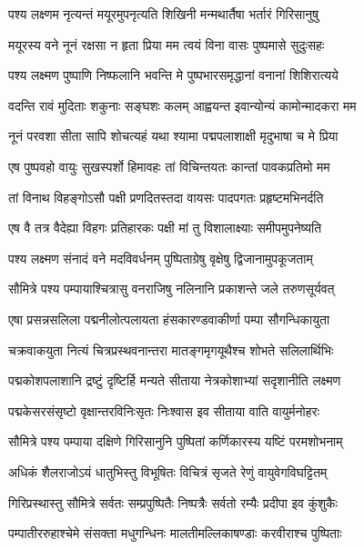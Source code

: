 \twolineshloka
{पश्य लक्ष्णम नृत्यन्तं मयूरमुपनृत्यति}
{शिखिनी मन्मथार्तैषा भर्तारं गिरिसानुषु} %

\twolineshloka
{मयूरस्य वने नूनं रक्षसा न हृता प्रिया}
{मम त्वयं विना वासः पुष्पमासे सुदुःसहः} %

\twolineshloka
{पश्य लक्ष्मण पुष्पाणि निष्फलानि भवन्ति मे}
{पुष्पभारसमृद्धानां वनानां शिशिरात्यये} %

\twolineshloka
{वदन्ति रावं मुदिताः शकुनाः सङ्घशः कलम्}
{आह्वयन्त इवान्योन्यं कामोन्मादकरा मम} %

\twolineshloka
{नूनं परवशा सीता सापि शोचत्यहं यथा}
{श्यामा पद्मपलाशाक्षी मृदुभाषा च मे प्रिया} %

\twolineshloka
{एष पुष्पवहो वायुः सुखस्पर्शो हिमावहः}
{तां विचिन्तयतः कान्तां पावकप्रतिमो मम} %

\twolineshloka
{तां विनाथ विहङ्गोऽसौ पक्षी प्रणदितस्तदा}
{वायसः पादपगतः प्रहृष्टमभिनर्दति} %

\twolineshloka
{एष वै तत्र वैदेह्या विहगः प्रतिहारकः}
{पक्षी मां तु विशालाक्ष्याः समीपमुपनेष्यति} %

\twolineshloka
{पश्य लक्ष्मण संनादं वने मदविवर्धनम्}
{पुष्पिताग्रेषु वृक्षेषु द्विजानामुपकूजताम्} %

\twolineshloka
{सौमित्रे पश्य पम्पायाश्चित्रासु वनराजिषु}
{नलिनानि प्रकाशन्ते जले तरुणसूर्यवत्} %

\twolineshloka
{एषा प्रसन्नसलिला पद्मनीलोत्पलायता}
{हंसकारण्डवाकीर्णा पम्पा सौगन्धिकायुता} %

\twolineshloka
{चक्रवाकयुता नित्यं चित्रप्रस्थवनान्तरा}
{मातङ्गमृगयूथैश्च शोभते सलिलार्थिभिः} %

\twolineshloka
{पद्मकोशपलाशानि द्रष्टुं दृष्टिर्हि मन्यते}
{सीताया नेत्रकोशाभ्यां सदृशानीति लक्ष्मण} %

\twolineshloka
{पद्मकेसरसंसृष्टो वृक्षान्तरविनिःसृतः}
{निःश्वास इव सीताया वाति वायुर्मनोहरः} %

\twolineshloka
{सौमित्रे पश्य पम्पाया दक्षिणे गिरिसानुनि}
{पुष्पितां कर्णिकारस्य यष्टिं परमशोभनाम्} %

\twolineshloka
{अधिकं शैलराजोऽयं धातुभिस्तु विभूषितः}
{विचित्रं सृजते रेणुं वायुवेगविघट्टितम्} %

\twolineshloka
{गिरिप्रस्थास्तु सौमित्रे सर्वतः सम्प्रपुष्पितैः}
{निष्पत्रैः सर्वतो रम्यैः प्रदीपा इव कुंशुकैः} %

\twolineshloka
{पम्पातीररुहाश्चेमे संसक्ता मधुगन्धिनः}
{मालतीमल्लिकाषण्डाः करवीराश्च पुष्पिताः} %

